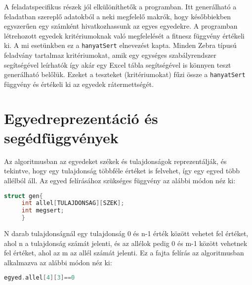 \documentclass[12pt,a4paper,oneside]{report}
\begin{document}

A feladatspecifikus részek jól elkülöníthetők a programban.
Itt generálható a feladatban szereplő adatokból a neki megfelelő makrók, hogy későbbiekben egyszerűen egy számként hivatkozhassunk az egyes egyedekre.
A programban létrehozott egyedek kritériumoknak való megfelelését a fitnesz függvény értékeli ki.
A mi esetünkben ez a \texttt{hanyatSert} elnevezést kapta.
Minden Zebra típusú feladvány tartalmaz kritériumokat, amik egy egységes szabályrendszer segítségével leírhatók így akár egy Excel tábla segítségével is könnyen teszt generálható belőlük.
Ezeket a teszteket (kritériumokat) fűzi össze a \texttt{hanyatSert} függvény és értékeli ki az egyedek rátermettségét.

    \section{Egyedreprezentáció és segédfüggvények} %

	
			Az algoritmusban az egyedeket székek és tulajdonságok reprezentálják, és tekintve, hogy egy tulajdonság többféle értéket is felvehet, így egy egyed több allélból áll. Az egyed felírásához szükséges függvény az alábbi módon néz ki:

	\begin{lstlisting}[frame=single, language=C]
	struct gen{
   	 int allel[TULAJDONSAG][SZEK];
   	 int megsert;
   	 }
	\end{lstlisting}
	
			N darab tulajdonságnál egy tulajdonság 0 és n-1 érték között vehetet fel értéket, ahol n a tulajdonság számát jelenti, és az allélok pedig 0 és m-1 között vehetnek fel értéket, ahol az m az allél számát jelenti. Ez a fajta felírás az algoritmusban alkalmazva az alábbi 		módon néz ki:
	\begin{lstlisting}[frame=single, language=C]
	egyed.allel[4][3]==0
	\end{lstlisting}
			
\end{document}
